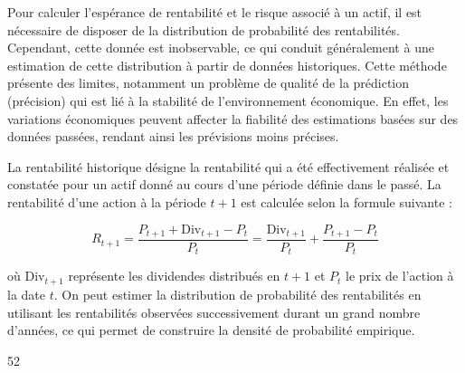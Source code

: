 \documentclass[a4paper, 12pt]{report}
\begin{document}
Pour calculer l'espérance de rentabilité et le risque associé à un actif, il est nécessaire de disposer de la distribution de probabilité des rentabilités. Cependant, cette donnée est inobservable, ce qui conduit généralement à une estimation de cette distribution à partir de données historiques. Cette méthode présente des limites, notamment un problème de qualité de la prédiction (précision) qui est lié à la stabilité de l'environnement économique. En effet, les variations économiques peuvent affecter la fiabilité des estimations basées sur des données passées, rendant ainsi les prévisions moins précises.

La rentabilité historique désigne la rentabilité qui a été effectivement réalisée et constatée pour un actif donné au cours d'une période définie dans le passé. La rentabilité d'une action à la période \( t + 1 \) est calculée selon la formule suivante :

\[
R_{t+1} = \frac{P_{t+1} + \text{Div}_{t+1} - P_t}{P_t} = \frac{\text{Div}_{t+1}}{P_t} + \frac{P_{t+1} - P_t}{P_t}
\]

où \( \text{Div}_{t+1} \) représente les dividendes distribués en \( t + 1 \) et \( P_t \) le prix de l'action à la date \( t \). On peut estimer la distribution de probabilité des rentabilités en utilisant les rentabilités observées successivement durant un grand nombre d'années, ce qui permet de construire la densité de probabilité empirique.

52
\end{document}
